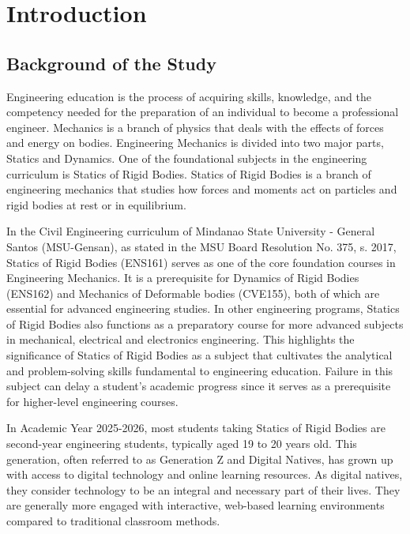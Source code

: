 \chapter{Introduction}\label{ch:1}

\section{Background of the Study}\label{sec:1-bos}

Engineering education is the process of acquiring skills, knowledge, and the competency needed for the preparation of an individual to become a professional engineer. Mechanics is a branch of physics that deals with the effects of forces and energy on bodies. Engineering Mechanics is divided into two major parts, Statics and Dynamics. One of the foundational subjects in the engineering curriculum is Statics of Rigid Bodies. Statics of Rigid Bodies is a branch of engineering mechanics that studies how forces and moments act on particles and rigid bodies at rest or in equilibrium. 

In the Civil Engineering curriculum of Mindanao State University - General Santos (MSU-Gensan), as stated in the MSU Board Resolution No. 375, s. 2017, Statics of Rigid Bodies (ENS161) serves as one of the core foundation courses in Engineering Mechanics. It is a prerequisite for Dynamics of Rigid Bodies (ENS162) and Mechanics of Deformable bodies (CVE155), both of which are essential for advanced engineering studies. In other engineering programs, Statics of Rigid Bodies also functions as a preparatory course for more advanced subjects in mechanical, electrical and electronics engineering. This highlights the significance of Statics of Rigid Bodies as a subject that cultivates the analytical and problem-solving skills fundamental to engineering education. Failure in this subject can delay a student’s academic progress since it serves as a prerequisite for higher-level engineering courses. 

In Academic Year 2025-2026, most students taking Statics of Rigid Bodies are second-year engineering students, typically aged 19 to 20 years old. This generation, often referred to as Generation Z and Digital Natives, has grown up with access to digital technology and online learning resources. As digital natives, they consider technology to be an integral and necessary part of their lives. They are generally more engaged with interactive, web-based learning environments compared to traditional classroom methods.  

